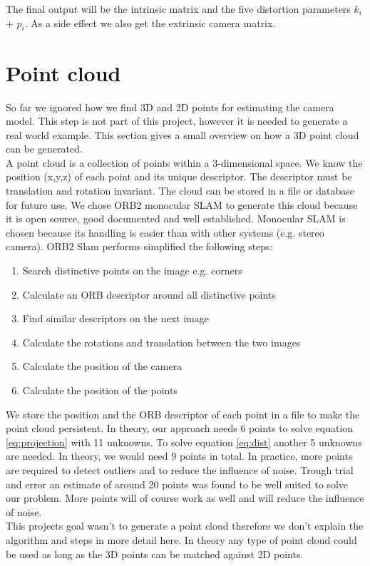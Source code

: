 \documentclass[11pt,a4paper,titlepage,oneside]{report}
\begin{document}
The final output will be the intrinsic matrix and the five distortion parameters $k_i$ + $p_i$. As a side effect we also get the extrinsic camera matrix.

\section{Point cloud}
So far we ignored how we find 3D and 2D points for estimating the camera model. This step is not part of this project, however it is needed to generate a real world example. This section gives a small overview on how a 3D point cloud can be generated.\\
A point cloud is a collection of points within a 3-dimensional space. We know the position (x,y,z) of each point and its unique descriptor. The descriptor must be translation and rotation invariant. The cloud can be stored in a file or database for future use. We chose ORB2 monocular SLAM \cite{orbslam2} to generate this cloud because it is open source, good documented and well established. Monocular SLAM is chosen because its handling is easier than with other systems (e.g. stereo camera). ORB2 Slam performs simplified the following steps:
\begin{enumerate}
\item Search distinctive points on the image e.g. corners
\item Calculate an ORB descriptor around all distinctive points
\item Find similar descriptors on the next image
\item Calculate the rotations and translation between the two images
\item Calculate the position of the camera
\item Calculate the position of the points
\end{enumerate}
We store the position and the ORB descriptor of each point in a file to make the point cloud persistent.
In theory, our approach needs 6 points to solve equation \ref{eq:projection} with 11 unknowns. To solve equation \ref{eq:dist} another 5 unknowns are needed. In theory, we would need 9 points in total. In practice, more points are required to detect outliers and to reduce the influence of noise. Trough trial and error an estimate of around 20 points was found to be well suited to solve our problem. More points will of course work as well and will reduce the influence of noise.\\
This projects goal wasn't to generate a point cloud therefore we don't explain the algorithm and steps in more detail here. In theory any type of point cloud could be used as long as the 3D points can be matched against 2D points.
\end{document}
